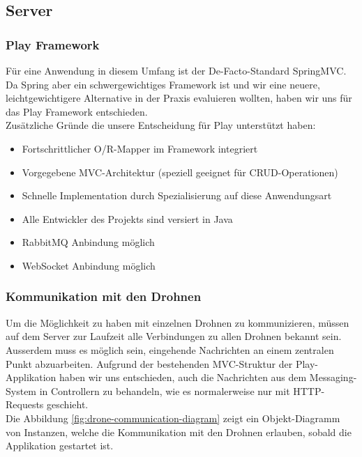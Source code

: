 \subsection{Server}

\subsubsection{Play Framework}
Für eine Anwendung in diesem Umfang ist der De-Facto-Standard SpringMVC. Da Spring aber ein schwergewichtiges Framework ist und wir eine neuere, leichtgewichtigere Alternative in der Praxis evaluieren wollten, haben wir uns für das Play Framework entschieden.\\

Zusätzliche Gründe die unsere Entscheidung für Play unterstützt haben:

\begin{itemize}
    \item Fortschrittlicher O/R-Mapper im Framework integriert
    \item Vorgegebene MVC-Architektur (speziell geeignet für \Gls{CRUD}-Operationen)
    \item Schnelle Implementation durch Spezialisierung auf diese Anwendungsart 
    \item Alle Entwickler des Projekts sind versiert in Java
    \item RabbitMQ Anbindung möglich
    \item WebSocket Anbindung möglich
\end{itemize}

\subsubsection{Kommunikation mit den Drohnen}

Um die Möglichkeit zu haben mit einzelnen Drohnen zu kommunizieren, müssen auf dem Server zur Laufzeit alle Verbindungen zu allen Drohnen bekannt sein. Ausserdem muss es möglich sein, eingehende Nachrichten an einem zentralen Punkt abzuarbeiten. Aufgrund der bestehenden MVC-Struktur der Play-Applikation haben wir uns entschieden, auch die Nachrichten aus dem Messaging-System in Controllern zu behandeln, wie es normalerweise nur mit HTTP-Requests geschieht.\\

Die Abbildung \ref{fig:drone-communication-diagram} zeigt ein Objekt-Diagramm von Instanzen, welche die Kommunikation mit den Drohnen erlauben, sobald die Applikation gestartet ist.

